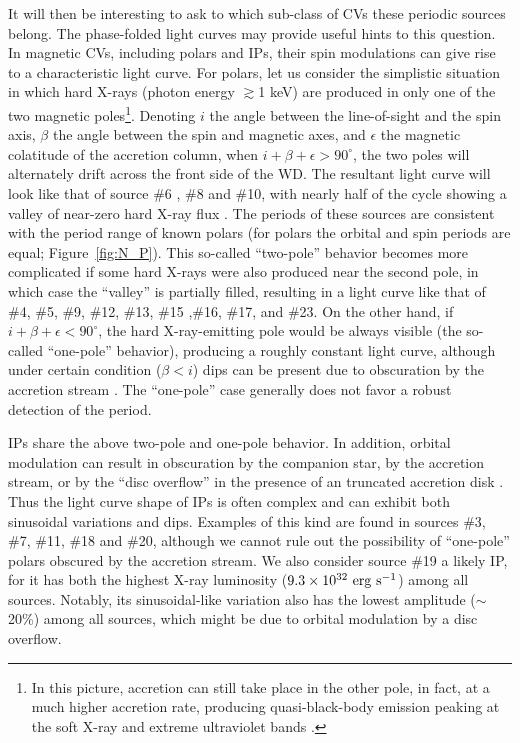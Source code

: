 \documentclass[fleqn,usenatbib]{mnras}
\begin{document}
It will then be interesting to ask to which sub-class of CVs these periodic sources belong. The phase-folded light curves may provide useful hints to this question. 
In magnetic CVs, including polars and IPs, their spin modulations can give rise to a characteristic light curve. For polars, let us consider the simplistic situation in which hard X-rays (photon energy $\gtrsim$1 keV) are produced in only one of the two magnetic poles\footnote{In this picture, accretion can still take place in the other pole, in fact, at a much higher accretion rate, producing quasi-black-body emission peaking at the soft X-ray and extreme ultraviolet bands \citep{2001cvs..book.....H}.}.
Denoting $i$ the angle between the line-of-sight and the spin axis, $\beta$ the angle between the spin and magnetic axes, and $\epsilon$ the magnetic colatitude of the accretion column, when $i+\beta+\epsilon > 90^{\circ}$, the two poles will alternately drift across the front side of the WD. 
The resultant light curve will look like that of source \#6 , \#8 and \#10, with nearly half of the cycle showing a valley of near-zero hard X-ray flux \citep{1985A&A...148L..14H}. 
The periods of these sources are consistent with the period range of known polars (for polars the orbital and spin periods are equal; Figure~\ref{fig:N_P}).
This so-called ``two-pole'' behavior becomes more complicated if some hard X-rays were also produced near the second pole, in which case the ``valley'' is partially filled, resulting in a light curve like that of \#4, \#5, \#9, \#12, \#13, \#15 ,\#16, \#17, and \#23. 
On the other hand, if $i+\beta+\epsilon < 90^{\circ}$, the hard X-ray-emitting pole would be always visible (the so-called ``one-pole'' behavior), producing a roughly constant light curve, although under certain condition ($\beta < i$) dips can be present due to obscuration by the accretion stream \citep{2001cvs..book.....H}. The ``one-pole'' case generally does not favor a robust detection of the period. 

IPs share the above two-pole and one-pole behavior. 
In addition, orbital modulation can result in obscuration by the companion star,
by the accretion stream, or by the ``disc overflow'' in the presence of an truncated accretion disk \citep{1996MNRAS.280..937N}. 
Thus the light curve shape of IPs is often complex and can exhibit both sinusoidal variations and dips. Examples of this kind are found in sources \#3, \#7, \#11, \#18 and \#20, although we cannot rule out the possibility of ``one-pole'' polars obscured by the accretion stream.
We also consider source \#19 a likely IP, for it has both the highest X-ray luminosity ($9.3\times10^{32}{\rm~erg~s^{-1}}$) among all sources. Notably, its sinusoidal-like variation also has the lowest amplitude ($\sim$20\%) among all sources, which might be due to orbital modulation by a disc overflow. 
\end{document}

